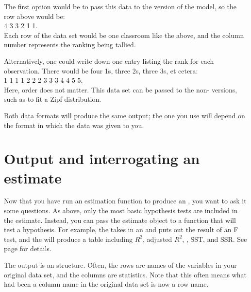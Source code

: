 The first option would be to pass this data to
the  version of the model, so the row above would be:\\
4 3 3 2 1 1.\\
Each row of the data set would be one classroom like the above, and the
column number represents the ranking being tallied.

Alternatively, one could 
write down one entry listing the rank for each observation. There would
be four 1s, three 2s, three 3s, et cetera:\\
1 1 1 1 2 2 2 3 3 3 4 4 5 5.\\
Here, order does not matter.  This data set can be passed to the
non- versions, such as  to fit a
Zipf distribution.

Both data formats will produce the same output; the one you use will
depend on the format in which the data was given to you.




\section{Output and interrogating an estimate}  \label{testoutput}
Now that you have run an estimation function to produce an 
, you want to ask it some questions. As
above, only the most basic hypothesis tests are included in the
estimate. Instead, you can pass the estimate object to a function that
will test a hypothesis. For example, the 
takes in an  and puts out the result of an
F test, and the 
will produce a table including $R^2$, adjusted $R^2$, , SST,
and SSR. See page \pageref{randfexercise} for details. 
 

The output is an  structure. Often, the rows are
names of the variables in your original data set, and the columns are
statistics. Note that this often means what had been a column name in the 
original data set is now a row name. 


